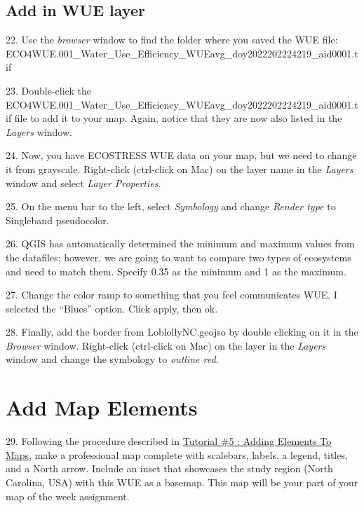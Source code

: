\documentclass[oneside,a4paper,11pt,explicit]{book}
\begin{document}
\subsection{Add in WUE layer}

22. Use the \textit{browser} window to find the folder where you saved the WUE file: \\ ECO4WUE.001\_Water\_Use\_Efficiency\_WUEavg\_doy2022202224219\_aid0001.tif

23. Double-click the ECO4WUE.001\_Water\_Use\_Efficiency\_WUEavg\_doy2022202224219\_aid0001.tif file to add it to your map. Again, notice that they are now also listed in the \textit{Layers} window.


24. Now, you have ECOSTRESS WUE data on your map, but we need to change it from grayscale. Right-click (ctrl-click on Mac) on the layer name in the \textit{Layers} window and select \textit{Layer Properties}. 

25. On the menu bar to the left, select \textit{Symbology} and change \textit{Render type} to Singleband pseudocolor. 

26. QGIS has automatically determined the minimum and maximum values from the datafiles; however, we are going to want to compare two types of ecosystems and need to match them. Specify 0.35 as the minimum and 1 as the maximum. 

27. Change the color ramp to something that you feel communicates WUE. I selected the ``Blues'' option. Click apply, then ok.

28. Finally, add the border from LoblollyNC.geojso by double clicking on it in the \textit{Browser} window. Right-click (ctrl-click on Mac) on the layer in the \textit{Layers} window and change the symbology to \textit{outline red}. 


\section{Add Map Elements}

29. Following the procedure described in \href{https://jeremydforsythe.github.io/icecream-tutorials/Tutorial5_AddingElementsToMaps/Tutorial5_AddingElementsToMaps.pdf}{Tutorial \#5 : Adding Elements To Maps}, make a professional map complete with scalebars, labels, a legend, titles, and a North arrow. Include an inset that showcases the study region (North Carolina, USA) with this WUE as a basemap. This map will be your part of your map of the week assignment.
\end{document}
